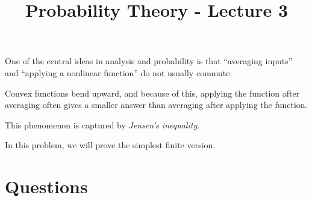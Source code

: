 \documentclass[12pt]{article}
\title{Probability Theory - Lecture 3}
\author{}
\date{}
\begin{document}
\maketitle

One of the central ideas in analysis and probability is that
``averaging inputs'' and ``applying a nonlinear function''
do not usually commute.

Convex functions bend upward,
and because of this,
applying the function after averaging often gives a smaller answer
than averaging after applying the function.

This phenomenon is captured by \textit{Jensen's inequality}.

In this problem, we will prove the simplest finite version.

\section*{Questions}
\end{document}
